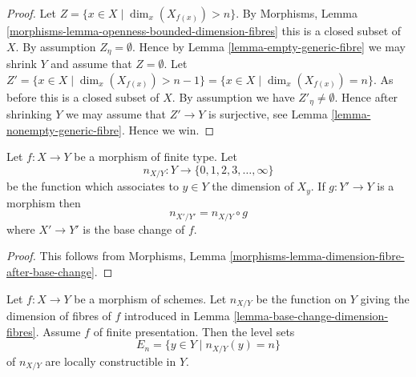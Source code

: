 \begin{proof}
Let $Z = \{x \in X \mid \dim_x(X_{f(x)}) > n \}$. By
Morphisms, Lemma \ref{morphisms-lemma-openness-bounded-dimension-fibres}
this is a closed subset of $X$. By assumption $Z_\eta = \emptyset$.
Hence by
Lemma \ref{lemma-empty-generic-fibre}
we may shrink $Y$ and assume that $Z = \emptyset$. Let
$Z' = \{x \in X \mid \dim_x(X_{f(x)}) > n - 1 \} =
\{x \in X \mid \dim_x(X_{f(x)}) = n\}$. As before this is a closed subset
of $X$. By assumption we have $Z'_\eta \not = \emptyset$. Hence after
shrinking $Y$ we may assume that $Z' \to Y$ is surjective, see
Lemma \ref{lemma-nonempty-generic-fibre}.
Hence we win.
\end{proof}

\begin{lemma}
\label{lemma-base-change-dimension-fibres}
Let $f : X \to Y$ be a morphism of finite type. Let
$$
n_{X/Y} : Y \to \{0, 1, 2, 3, \ldots, \infty\}
$$
be the function which associates to $y \in Y$ the dimension of $X_y$.
If $g : Y' \to Y$ is a morphism then
$$
n_{X'/Y'} = n_{X/Y} \circ g
$$
where $X' \to Y'$ is the base change of $f$.
\end{lemma}

\begin{proof}
This follows from
Morphisms, Lemma \ref{morphisms-lemma-dimension-fibre-after-base-change}.
\end{proof}

\begin{lemma}
\label{lemma-dimension-fibres-constructible}
Let $f : X \to Y$ be a morphism of schemes. Let
$n_{X/Y}$ be the function on $Y$ giving the dimension of fibres of $f$
introduced in
Lemma \ref{lemma-base-change-dimension-fibres}.
Assume $f$ of finite presentation. Then the level sets
$$
E_n = \{y \in Y \mid n_{X/Y}(y) = n\}
$$
of $n_{X/Y}$ are locally constructible in $Y$.
\end{lemma}

